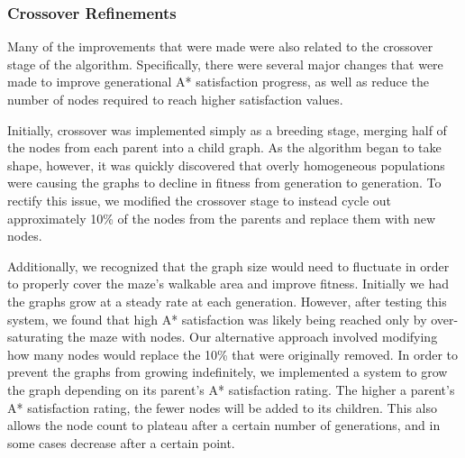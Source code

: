 	\subsubsection{Crossover Refinements}
	Many of the improvements that were made were also related to the crossover stage of the algorithm. Specifically, there were several major changes that were made to improve generational A* satisfaction progress, as well as reduce the number of nodes required to reach higher satisfaction values.
	
	Initially, crossover was implemented simply as a breeding stage, merging half of the nodes from each parent into a child graph. As the algorithm began to take shape, however, it was quickly discovered that overly homogeneous populations were causing the graphs to decline in fitness from generation to generation. To rectify this issue, we modified the crossover stage to instead cycle out approximately 10\% of the nodes from the parents and replace them with new nodes.
	
	Additionally, we recognized that the graph size would need to fluctuate in order to properly cover the maze's walkable area and improve fitness. Initially we had the graphs grow at a steady rate at each generation. However, after testing this system, we found that high A* satisfaction was likely being reached only by over-saturating the maze with nodes. Our alternative approach involved modifying how many nodes would replace the 10\% that were originally removed. In order to prevent the graphs from growing indefinitely, we implemented a system to grow the graph depending on its parent's A* satisfaction rating. The higher a parent's A* satisfaction rating, the fewer nodes will be added to its children. This also allows the node count to plateau after a certain number of generations, and in some cases decrease after a certain point.
	
	
	
	
	
	
